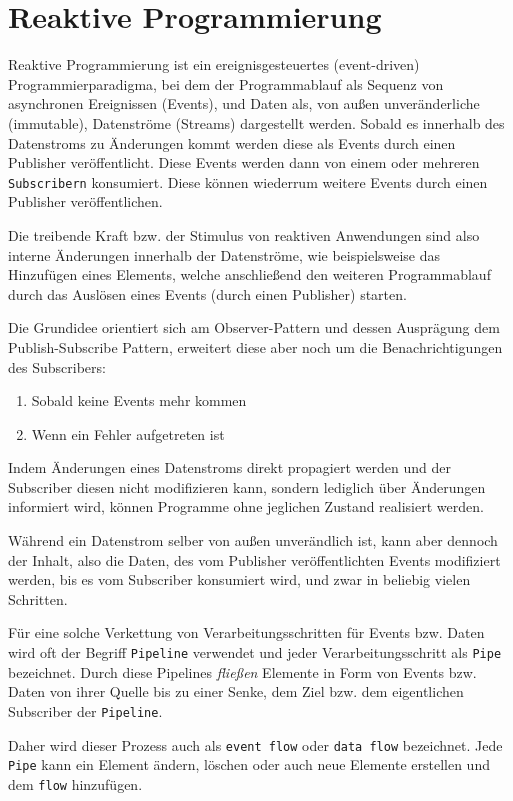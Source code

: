 \section{Reaktive Programmierung}
\label{section:reaktive_programmierung}
Reaktive Programmierung ist ein ereignisgesteuertes (event-driven) Programmierparadigma, bei dem der Programmablauf
als Sequenz von asynchronen Ereignissen (Events), und Daten als, von außen unveränderliche (immutable), Datenströme (Streams) dargestellt werden.
Sobald es innerhalb des Datenstroms zu Änderungen kommt werden diese als Events durch einen Publisher veröffentlicht.
Diese Events werden dann von einem oder mehreren \verb|Subscribern| konsumiert. Diese können wiederrum weitere Events durch einen Publisher veröffentlichen.

Die treibende Kraft bzw. der Stimulus von reaktiven Anwendungen sind also interne Änderungen innerhalb der Datenströme, wie beispielsweise das
Hinzufügen eines Elements, welche anschließend den weiteren Programmablauf durch das Auslösen eines Events (durch einen Publisher) starten.

Die Grundidee orientiert sich am Observer-Pattern und dessen Ausprägung dem Publish-Subscribe Pattern, erweitert diese aber
noch um die Benachrichtigungen des Subscribers:
\begin{enumerate}
    \item Sobald keine Events mehr kommen
    \item Wenn ein Fehler aufgetreten ist
\end{enumerate}
Indem Änderungen eines Datenstroms direkt propagiert werden und der Subscriber diesen nicht modifizieren kann, sondern lediglich über Änderungen informiert wird,
können Programme ohne jeglichen Zustand realisiert werden\parencite{Escoffier2017}.

Während ein Datenstrom selber von außen unverändlich ist, kann aber dennoch der Inhalt, also die Daten,
des vom Publisher veröffentlichten Events modifiziert werden, bis es vom
Subscriber konsumiert wird, und zwar in beliebig vielen Schritten.

Für eine solche Verkettung von Verarbeitungsschritten für Events bzw. Daten
wird oft der Begriff \verb|Pipeline| verwendet und jeder Verarbeitungsschritt als \verb|Pipe| bezeichnet.
Durch diese Pipelines \textit{fließen} Elemente in Form von Events bzw. Daten von ihrer Quelle
bis zu einer Senke, dem Ziel bzw. dem eigentlichen Subscriber der \verb|Pipeline|.

Daher wird dieser Prozess auch als \verb|event flow| oder \verb|data flow| bezeichnet.
Jede \verb|Pipe| kann ein Element ändern, löschen oder auch neue Elemente erstellen und dem \verb|flow| hinzufügen.


